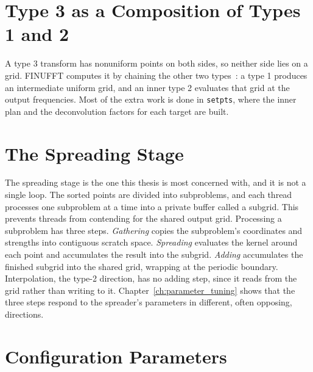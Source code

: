 \section{Type 3 as a Composition of Types 1 and 2}

A type 3 transform has nonuniform points on both sides, so neither side lies on a grid. FINUFFT computes it by chaining the other two types~\cite{barnett2019}: a type 1 produces an intermediate uniform grid, and an inner type 2 evaluates that grid at the output frequencies. Most of the extra work is done in \texttt{setpts}, where the inner plan and the deconvolution factors for each target are built.

\section{The Spreading Stage}
\label{sec:spreading_stage}

The spreading stage is the one this thesis is most concerned with, and it is not a single loop. The sorted points are divided into subproblems, and each thread processes one subproblem at a time into a private buffer called a subgrid. This prevents threads from contending for the shared output grid. Processing a subproblem has three steps. \emph{Gathering} copies the subproblem's coordinates and strengths into contiguous scratch space. \emph{Spreading} evaluates the kernel around each point and accumulates the result into the subgrid. \emph{Adding} accumulates the finished subgrid into the shared grid, wrapping at the periodic boundary. Interpolation, the type-2 direction, has no adding step, since it reads from the grid rather than writing to it. Chapter~\ref{ch:parameter_tuning} shows that the three steps respond to the spreader's parameters in different, often opposing, directions.

\section{Configuration Parameters}
\label{sec:finufft_parameters}

